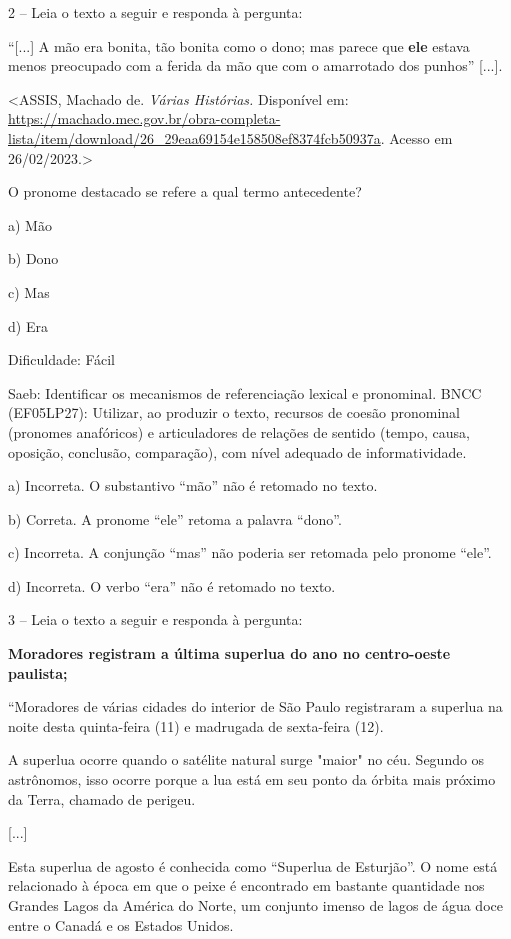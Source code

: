2 -- Leia o texto a seguir e responda à pergunta:

``{[}...{]} A mão era bonita, tão bonita como o dono; mas parece que
\textbf{ele} estava menos preocupado com a ferida da mão que com o
amarrotado dos punhos'' {[}...{]}.

\textless{}ASSIS, Machado de. \emph{Várias Histórias.} Disponível em:
\url{https://machado.mec.gov.br/obra-completa-lista/item/download/26_29eaa69154e158508ef8374fcb50937a}.
Acesso em 26/02/2023.\textgreater{}

O pronome destacado se refere a qual termo antecedente?

a) Mão

b) Dono

c) Mas

d) Era

Dificuldade: Fácil

Saeb: Identificar os mecanismos de referenciação lexical e pronominal.
BNCC (EF05LP27): Utilizar, ao produzir o texto, recursos de coesão
pronominal (pronomes anafóricos) e articuladores de relações de sentido
(tempo, causa, oposição, conclusão, comparação), com nível adequado de
informatividade.

a) Incorreta. O substantivo ``mão'' não é retomado no texto.

b) Correta. A pronome ``ele'' retoma a palavra ``dono''.

c) Incorreta. A conjunção ``mas'' não poderia ser retomada pelo pronome
``ele''.

d) Incorreta. O verbo ``era'' não é retomado no texto.

3 -- Leia o texto a seguir e responda à pergunta:

\textbf{Moradores registram a última superlua do ano no centro-oeste
paulista;}

``Moradores de várias cidades do interior de São Paulo registraram a
superlua na noite desta quinta-feira (11) e madrugada de sexta-feira
(12).

A superlua ocorre quando o satélite natural surge "maior" no céu.
Segundo os astrônomos, isso ocorre porque a lua está em seu ponto da
órbita mais próximo da Terra, chamado de perigeu.

{[}...{]}

Esta superlua de agosto é conhecida como ``Superlua de Esturjão''. O
nome está relacionado à época em que o peixe é encontrado em bastante
quantidade nos Grandes Lagos da América do Norte, um conjunto imenso de
lagos de água doce entre o Canadá e os Estados Unidos.

